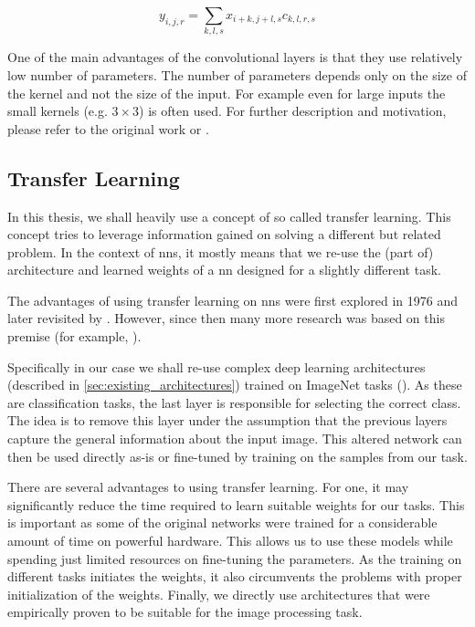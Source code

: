 $$y_{i, j, r} = \sum_{k, l, s} x_{i+k, j+l, s} c_{k, l, r, s}$$

One of the main advantages of the convolutional layers is that they use relatively low number of parameters. The number of parameters depends only on the size of the kernel and not the size of the input. For example even for large inputs the small kernels (e.g. $3 \times 3$) is often used. For further description and motivation, please refer to the original work or \cite{deeplearningbook}.

\subsection{Transfer Learning}

\label{ssec:transfer_learning}

In this thesis, we shall heavily use a concept of so called transfer learning. This concept tries to leverage information gained on solving a different but related problem. In the context of \glspl{nn}, it mostly means that we re-use the (part of) architecture and learned weights of a \gls{nn} designed for a slightly different task.

The advantages of using transfer learning on \glspl{nn} were first explored in 1976 and later revisited by \cite{transferreviewed}. However, since then many more research was based on this premise (for example, \cite{transferlearning}).

Specifically in our case we shall re-use complex deep learning architectures (described in \autoref{sec:existing_architectures}) trained on ImageNet tasks (\cite{imagenetresults}). As these are classification tasks, the last layer is responsible for selecting the correct class. The idea is to remove this layer under the assumption that the previous layers capture the general information about the input image. This altered network can then be used directly as-is or fine-tuned by training on the samples from our task.

There are several advantages to using transfer learning. For one, it may significantly reduce the time required to learn suitable weights for our tasks. This is important as some of the original networks were trained for a considerable amount of time on powerful hardware. This allows us to use these models while spending just limited resources on fine-tuning the parameters. As the training on different tasks initiates the weights, it also circumvents the problems with proper initialization of the weights. Finally, we directly use architectures that were empirically proven to be suitable for the image processing task.

